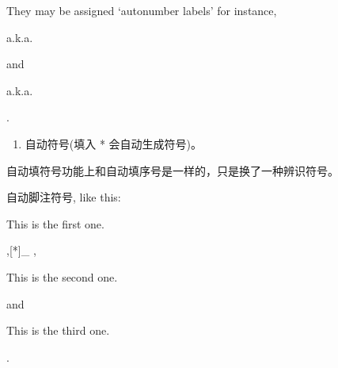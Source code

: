 \documentclass[a4paper,10pt,english]{sphinxmanual}
\begin{document}
\sphinxAtStartPar
{}

\sphinxAtStartPar
They may be assigned ‘autonumber
labels’ \sphinxhyphen{} for instance,
%
\begin{footnote}[7]\sphinxAtStartFootnote
a.k.a. {\hyperref[\detokenize{reStructureText_syntax:fourth}]{}}
%
\end{footnote} and %
\begin{footnote}[6]\sphinxAtStartFootnote
a.k.a. {\hyperref[\detokenize{reStructureText_syntax:third}]{}}
%
\end{footnote}.
\begin{enumerate}
%
\setcounter{enumi}{2}
\item {} 
\sphinxAtStartPar
自动符号(填入 * 会自动生成符号)。

\end{enumerate}

\sphinxAtStartPar
自动填符号功能上和自动填序号是一样的，只是换了一种辨识符号。

\sphinxAtStartPar
{}

\begin{sphinxVerbatim}[commandchars=\\\{\}]
   \PYG{p}{[}\PYG{p}{]} \PYG{p}{[}\PYG{p}{]}  \PYG{p}{[}\PYG{p}{]}  \PYG{p}{[}\PYG{p}{]}

 \PYG{p}{[}\PYG{p}{]}     
 \PYG{p}{[}\PYG{p}{]}     
 \PYG{p}{[}\PYG{p}{]}     
 \PYG{p}{[}\PYG{p}{]}     
\end{sphinxVerbatim}

\sphinxAtStartPar
{}

\sphinxAtStartPar
自动脚注符号, like this: %
\begin{footnote}[*]\sphinxAtStartFootnote
This is the first one.
%
\end{footnote} ,{[}*{]}\_ , %
\begin{footnote}[†]\sphinxAtStartFootnote
This is the second one.
%
\end{footnote} and %
\begin{footnote}[‡]\sphinxAtStartFootnote
This is the third one.
%
\end{footnote}.
\end{document}

